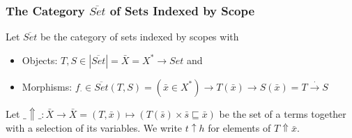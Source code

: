 \documentclass[aspectratio=169]{beamer}
\theoremstyle{remarkstyle}
\begin{document}
\begin{frame}[fragile]
  \frametitle{The Category $\overline{Set}$ of Sets Indexed by Scope}
  \begin{definition}
    Let $\overline{Set}$ be the category of sets indexed by scopes with
    \begin{itemize}
      \item Objects: $T, S ∈ |\overline{Set}| = \bar{X} = X^* → Set $ and 
      \item Morphisms: $f_⋅ ∈ \overline{Set}(T, S) = (\bar{x}∈X^*) → T(\bar{x}) → S(\bar{x}) = T \stackrel{⋅}{→} S$
    \end{itemize}
  \end{definition}
  \begin{definition}
    Let $\_⇑\_ : \bar{X} → \bar{X} = (T, \bar{x}) ↦ (T(\bar{s}) × \bar{s} ⊑ \bar{x})$ be the set of a terms together with a selection of its variables.
    We write $t ↑ h$ for elements of  $T ⇑ \bar{x}$. 
  \end{definition}
\end{frame}
\end{document}
